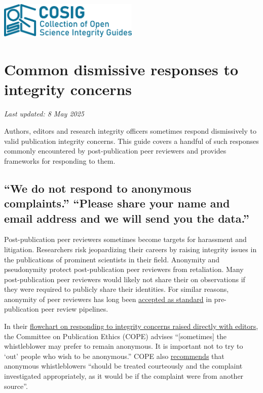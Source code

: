 \documentclass[letterpaper, 12pt]{article}
\begin{document}
\flushleft
\includegraphics[width=0.5\textwidth]{img/home/241017_final_logo_mockup.png}

\section*{Common dismissive responses to integrity concerns}
\textit{Last updated: 8 May 2025}

Authors, editors and research integrity officers sometimes respond dismissively to valid publication integrity concerns. This guide covers a handful of such responses commonly encountered by post-publication peer reviewers and provides frameworks for responding to them.

\subsection*{``We do not respond to anonymous complaints.''\newline 
``Please share your name and email address and we will send you the data.''}

Post-publication peer reviewers sometimes become targets for harassment and litigation. Researchers risk jeopardizing their careers by raising integrity issues in the publications of prominent scientists in their field. Anonymity and pseudonymity protect post-publication peer reviewers from retaliation. Many post-publication peer reviewers would likely not share their on observations if they were required to publicly share their identities. For similar reasons, anonymity of peer reviewers has long been \href{https://doi.org/10.1038/6295}{accepted as standard} in pre-publication peer review pipelines. 

In their \href{https://doi.org/10.24318/cope.2019.2.25}{flowchart on responding to integrity concerns raised directly with editors}, the Committee on Publication Ethics (COPE) advises ``[sometimes] the whistleblower may prefer
to remain anonymous. It is important not to try to `out' people who wish to be anonymous.'' COPE also \href{https://doi.org/10.24318/Z9gtPzCa}{recommends} that anonymous whistleblowers ``should be treated courteously and the complaint investigated appropriately, as it would be if the complaint were from another source''.
\end{document}
